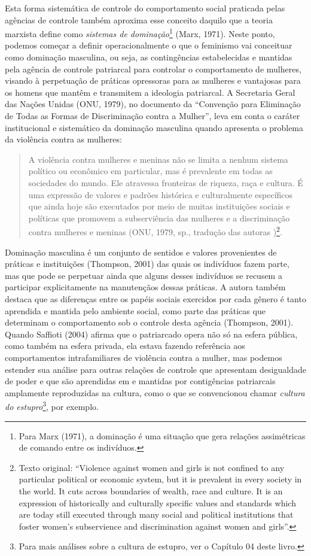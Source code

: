 Esta forma sistemática de controle do comportamento social praticada pelas agências de controle também aproxima esse conceito daquilo que a teoria marxista define como \textit{sistemas de dominação}\footnote{Para Marx (1971), a dominação é uma situação que gera relações assimétricas de comando entre os indivíduos.} (Marx, 1971). Neste ponto, podemos começar a definir operacionalmente o que o feminismo vai conceituar como dominação masculina, ou seja, as contingências estabelecidas e mantidas pela agência de controle patriarcal para controlar o comportamento de mulheres, visando à perpetuação de práticas opressoras para as mulheres e vantajosas para os homens que mantêm e transmitem a ideologia patriarcal. A Secretaria Geral das Nações Unidas (ONU, 1979), no documento da ``Convenção para Eliminação de Todas as Formas de Discriminação contra a Mulher'', leva em conta o caráter institucional e sistemático da dominação masculina quando apresenta o problema da violência contra as mulheres:

\begin{quote}
    A violência contra mulheres e meninas não se limita a nenhum sistema político ou econômico em particular, mas é prevalente em todas as sociedades do mundo. Ele atravessa fronteiras de riqueza, raça e cultura. É uma expressão de valores e padrões histórica e culturalmente específicos que ainda hoje são executados por meio de muitas instituições sociais e políticas que promovem a subserviência das mulheres e a discriminação contra mulheres e meninas (ONU, 1979, sp., tradução das autoras )\footnote{Texto original: ``Violence against women and girls is not confined to any particular political or economic system, but it is prevalent in every society in the world. It cuts across boundaries of wealth, race and culture. It is an expression of historically and culturally specific values and standards which are today still executed through many social and political institutions that foster women’s subservience and discrimination against women and girls''.}.
\end{quote}

Dominação masculina é um conjunto de sentidos e valores provenientes de práticas e instituições (Thompson, 2001) das quais os indivíduos fazem parte, mas que pode se perpetuar ainda que alguns desses indivíduos se recusem a participar explicitamente na manutençãos dessas práticas. A autora também destaca que as diferenças entre os papéis sociais exercidos por cada gênero é tanto aprendida e mantida pelo ambiente social, como parte das práticas que determinam o comportamento sob o controle desta agência (Thompson, 2001). Quando Saffioti (2004) afirma que o patriarcado opera não só na esfera pública, como também na esfera privada, ela estava fazendo referência aos comportamentos intrafamiliares de violência contra a mulher, mas podemos estender sua análise para outras relações de controle que apresentam desigualdade de poder e que são aprendidas em e mantidas por contigências patriarcais amplamente reproduzidas na cultura, como o que se convencionou chamar \textit{cultura do estupro}\footnote{Para mais análises sobre a cultura de estupro, ver o Capítulo 04 deste livro.}, por exemplo.

